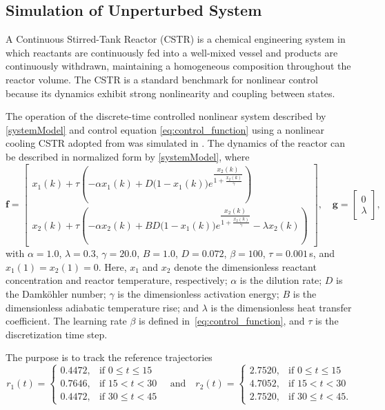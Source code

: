 \subsection{Simulation of Unperturbed System}

A Continuous Stirred-Tank Reactor (CSTR) is a chemical engineering system in
which reactants are continuously fed into a well-mixed vessel and products are
continuously withdrawn, maintaining a homogeneous composition throughout the
reactor volume. The CSTR is a standard benchmark for nonlinear control because
its dynamics exhibit strong nonlinearity and coupling between states.

The operation of the discrete-time controlled nonlinear system described by
\eqref{systemModel} and control equation \eqref{eq:control_function}
using a nonlinear cooling CSTR adopted from
\cite{yan2011model,soukkou2008optimal,juang2007recurrent} was
simulated in \cite{tymoshchuk2024tracking}. The dynamics of the reactor can
be described in normalized form by \eqref{systemModel}, where
\begin{equation}
	\label{eq:cstr_dynamics}
	\mathbf{f} =
	\begin{bmatrix}
		x_1(k) + \tau \left( -\alpha x_1(k) + D\bigl(1 - x_1(k)\bigr)
		e^{\dfrac{x_2(k)}{1 + \frac{x_2(k)}{\gamma}}} \right) \\[12pt]
		x_2(k) + \tau \left( -\alpha x_2(k) + BD\bigl(1 - x_1(k)\bigr)
		e^{\dfrac{x_2(k)}{1 + \frac{x_2(k)}{\gamma}}} - \lambda x_2(k) \right)
	\end{bmatrix}, \quad
	\mathbf{g} =
	\begin{bmatrix}
		0 \\ \lambda
	\end{bmatrix},
\end{equation}
with $\alpha = 1.0$, $\lambda = 0.3$, $\gamma = 20.0$,
$B = 1.0$, $D = 0.072$, $\beta = 100$, $\tau = 0.001$\,s,
and $x_1(1) = x_2(1) = 0$.
Here, $x_1$ and $x_2$ denote the dimensionless reactant concentration and
reactor temperature, respectively;
$\alpha$ is the dilution rate;
$D$ is the Damk\"ohler number;
$\gamma$ is the dimensionless activation energy;
$B$ is the dimensionless adiabatic temperature rise;
and $\lambda$ is the dimensionless heat transfer coefficient.
The learning rate $\beta$ is defined in~\eqref{eq:control_function},
and $\tau$ is the discretization time step.

The purpose is to track the reference trajectories
\begin{equation}
	\label{eq:cstr_references}
	r_1(t) =
	\begin{cases}
		0.4472, & \text{if } 0 \leq t \leq 15 \\
		0.7646, & \text{if } 15 < t < 30      \\
		0.4472, & \text{if } 30 \leq t < 45
	\end{cases}
	\quad \text{and} \quad
	r_2(t) =
	\begin{cases}
		2.7520, & \text{if } 0 \leq t \leq 15 \\
		4.7052, & \text{if } 15 < t < 30      \\
		2.7520, & \text{if } 30 \leq t < 45.
	\end{cases}
\end{equation}

